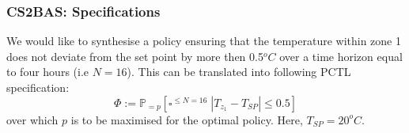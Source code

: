 \subsubsection{CS2BAS: Specifications}
We would like to synthesise a policy ensuring that the temperature within zone 1 does not deviate from the set point by more then 0.5$^oC$ over a time horizon equal to four hours (i.e $N= 16$). This can be translated into following PCTL specification:
\begin{equation*}
\Phi:= \mathbb{P}_{= p} [\square^{\le N=16} \; |T_{z_1}-T_{SP}| \le 0.5]
\end{equation*}
over which $p$ is to be maximised for the optimal policy. Here, $T_{SP} = 20^oC$.

